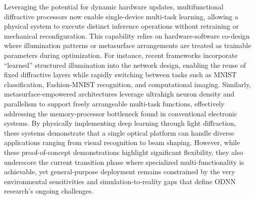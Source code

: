 Leveraging the potential for dynamic hardware updates, multifunctional diffractive processors now enable single-device multi-task learning, allowing a physical system to execute distinct inference operations without retraining or mechanical reconfiguration. This capability relies on hardware-software co-design where illumination patterns or metasurface arrangements are treated as trainable parameters during optimization. For instance, recent frameworks incorporate ``learned'' structured illumination into the network design, enabling the reuse of fixed diffractive layers while rapidly switching between tasks such as MNIST classification, Fashion-MNIST recognition, and computational imaging. Similarly, metasurface-empowered architectures leverage ultrahigh neuron density and parallelism to support freely arrangeable multi-task functions, effectively addressing the memory-processor bottleneck found in conventional electronic systems. By physically implementing deep learning through light diffraction, these systems demonstrate that a single optical platform can handle diverse applications ranging from visual recognition to beam shaping. However, while these proof-of-concept demonstrations highlight significant flexibility, they also underscore the current transition phase where specialized multi-functionality is achievable, yet general-purpose deployment remains constrained by the very environmental sensitivities and simulation-to-reality gaps that define ODNN research's ongoing challenges. \citep{doi_10_1364_ol_591818_8738c4b1} \citep{doi_10_1364_prj_576203_ae347fba}

